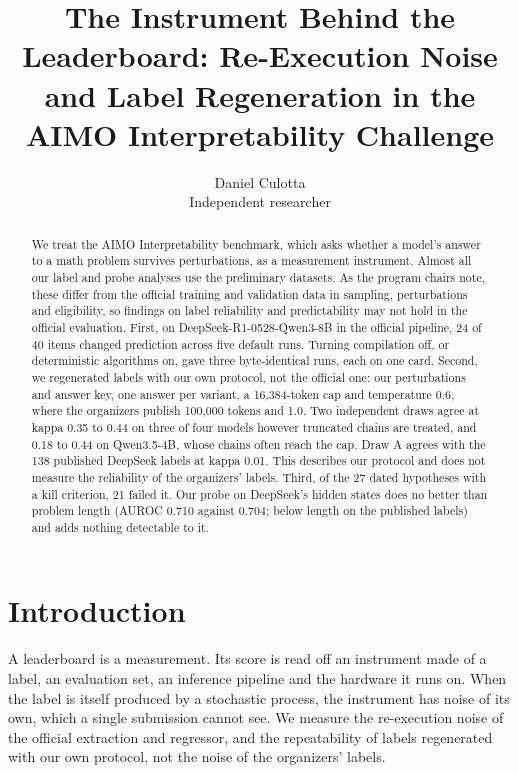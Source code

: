 \documentclass{article}
\title{The Instrument Behind the Leaderboard: Re-Execution Noise and Label Regeneration in the AIMO Interpretability Challenge}
\author{%
  Daniel Culotta \\
  Independent researcher
}
\begin{document}
\maketitle

\begin{abstract}
We treat the AIMO Interpretability benchmark, which asks whether a model's answer to a math problem survives perturbations, as a measurement instrument. Almost all our label and probe analyses use the preliminary datasets. As the program chairs note, these differ from the official training and validation data in sampling, perturbations and eligibility, so findings on label reliability and predictability may not hold in the official evaluation. First, on DeepSeek-R1-0528-Qwen3-8B in the official pipeline, 24 of 40 items changed prediction across five default runs. Turning compilation off, or deterministic algorithms on, gave three byte-identical runs, each on one card. Second, we regenerated labels with our own protocol, not the official one: our perturbations and answer key, one answer per variant, a 16,384-token cap and temperature 0.6, where the organizers publish 100,000 tokens and 1.0. Two independent draws agree at kappa 0.35 to 0.44 on three of four models however truncated chains are treated, and 0.18 to 0.44 on Qwen3.5-4B, whose chains often reach the cap. Draw A agrees with the 138 published DeepSeek labels at kappa 0.01. This describes our protocol and does not measure the reliability of the organizers' labels. Third, of the 27 dated hypotheses with a kill criterion, 21 failed it. Our probe on DeepSeek's hidden states does no better than problem length (AUROC 0.710 against 0.704; below length on the published labels) and adds nothing detectable to it.
\end{abstract}

\section{Introduction}\label{sec:1}

A leaderboard is a measurement. Its score is read off an instrument made of a label, an evaluation set, an inference pipeline and the hardware it runs on. When the label is itself produced by a stochastic process, the instrument has noise of its own, which a single submission cannot see. We measure the re-execution noise of the official extraction and regressor, and the repeatability of labels regenerated with our own protocol, not the noise of the organizers' labels.
\end{document}
